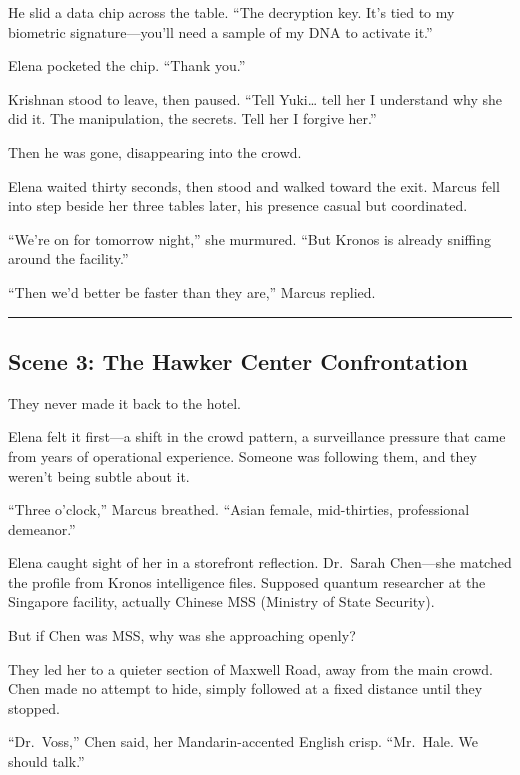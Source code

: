 He slid a data chip across the table. ``The decryption key. It's tied to
my biometric signature---you'll need a sample of my DNA to activate
it.''

Elena pocketed the chip. ``Thank you.''

Krishnan stood to leave, then paused. ``Tell Yuki\ldots{} tell her I
understand why she did it. The manipulation, the secrets. Tell her I
forgive her.''

Then he was gone, disappearing into the crowd.

Elena waited thirty seconds, then stood and walked toward the exit.
Marcus fell into step beside her three tables later, his presence casual
but coordinated.

``We're on for tomorrow night,'' she murmured. ``But Kronos is already
sniffing around the facility.''

``Then we'd better be faster than they are,'' Marcus replied.

\begin{center}\rule{0.5\linewidth}{0.5pt}\end{center}

\hypertarget{scene-3-the-hawker-center-confrontation}{%
\subsection{Scene 3: The Hawker Center
Confrontation}\label{scene-3-the-hawker-center-confrontation}}

They never made it back to the hotel.

Elena felt it first---a shift in the crowd pattern, a surveillance
pressure that came from years of operational experience. Someone was
following them, and they weren't being subtle about it.

``Three o'clock,'' Marcus breathed. ``Asian female, mid-thirties,
professional demeanor.''

Elena caught sight of her in a storefront reflection. Dr.~Sarah
Chen---she matched the profile from Kronos intelligence files. Supposed
quantum researcher at the Singapore facility, actually Chinese MSS
(Ministry of State Security).

But if Chen was MSS, why was she approaching openly?

They led her to a quieter section of Maxwell Road, away from the main
crowd. Chen made no attempt to hide, simply followed at a fixed distance
until they stopped.

``Dr.~Voss,'' Chen said, her Mandarin-accented English crisp.
``Mr.~Hale. We should talk.''

